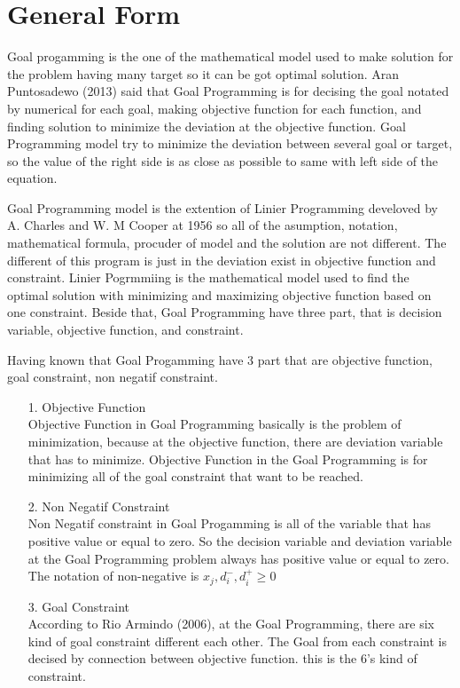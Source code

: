 \documentclass[twoside,twocolumn]{article}
\begin{document}
\section{General Form}
	Goal progamming is the one of the mathematical model used to make solution for the problem having many target so it can be got optimal solution. Aran Puntosadewo (2013) said that Goal Programming is for decising the goal notated by numerical for each goal, making objective function for each function, and finding solution to minimize the deviation at the objective function. Goal Programming model try to minimize the deviation between several goal or target, so the value of the right side is as close as possible to same with left side of the equation. 
	
	Goal Programming model is the extention of Linier Programming develoved by A. Charles and W. M Cooper at 1956 so all of the asumption, notation, mathematical formula, procuder of model and the solution are not different. The different of this program is just in the deviation exist in objective function and constraint. Linier Pogrmmiing is the mathematical model used to find the optimal solution with minimizing and maximizing objective function based on one constraint. Beside that, Goal Programming have three part, that is decision variable, objective function, and constraint.
	
	Having known that Goal Progamming have 3 part that are objective function, goal constraint, non negatif constraint. 
	\begin{itemize}
		\item[1. ] Objective Function\\
		Objective Function in Goal Programming basically is the problem of minimization, because at the objective function, there are deviation variable that has to minimize. Objective Function in the Goal Programming is for minimizing all of the goal constraint that want to be reached.
		
		\item[2. ] Non Negatif Constraint\\
		Non Negatif constraint in Goal Progamming is all of the variable that has positive value or equal to zero. So the decision variable and deviation variable at the Goal Programming problem always has positive value or equal to zero. The notation of non-negative is $x_j,d^-_i,d^+_i \geq 0$
		
		\item[3. ] Goal Constraint\\
		According to Rio Armindo (2006), at the Goal Programming, there are six kind of goal constraint different each other. The Goal from each constraint is decised by connection between objective function. this is the 6's kind of constraint.
	\end{itemize}
	
\end{document}
